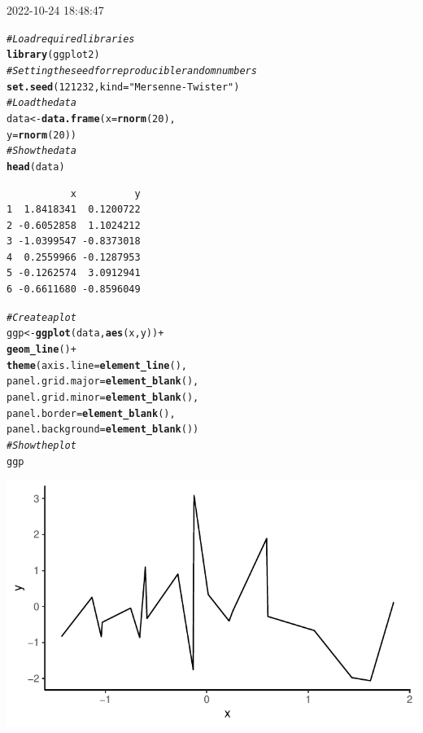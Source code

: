 \documentclass{article}\usepackage[]{graphicx}\usepackage[]{xcolor}
\makeatletter
\def\maxwidth{ %
  \ifdim\Gin@nat@width>\linewidth
    \linewidth
  \else
    \Gin@nat@width
  \fi
}
\newcommand{\hlnum}[1]{\textcolor[rgb]{0.686,0.059,0.569}{#1}}%
\newcommand{\hlstr}[1]{\textcolor[rgb]{0.192,0.494,0.8}{#1}}%
\newcommand{\hlcom}[1]{\textcolor[rgb]{0.678,0.584,0.686}{\textit{#1}}}%
\newcommand{\hlopt}[1]{\textcolor[rgb]{0,0,0}{#1}}%
\newcommand{\hlstd}[1]{\textcolor[rgb]{0.345,0.345,0.345}{#1}}%
\newcommand{\hlkwb}[1]{\textcolor[rgb]{0.69,0.353,0.396}{#1}}%
\newcommand{\hlkwc}[1]{\textcolor[rgb]{0.333,0.667,0.333}{#1}}%
\newcommand{\hlkwd}[1]{\textcolor[rgb]{0.737,0.353,0.396}{\textbf{#1}}}%
\newenvironment{kframe}{%
 \def\at@end@of@kframe{}%
 \ifinner\ifhmode%
  \def\at@end@of@kframe{\end{minipage}}%
  \begin{minipage}{\columnwidth}%
 \fi\fi%
 \def\FrameCommand##1{\hskip\@totalleftmargin \hskip-\fboxsep
 \colorbox{shadecolor}{##1}\hskip-\fboxsep
     \hskip-\linewidth \hskip-\@totalleftmargin \hskip\columnwidth}%
 \MakeFramed {\advance\hsize-\width
   \@totalleftmargin\z@ \linewidth\hsize
   \@setminipage}}%
 {\par\unskip\endMakeFramed%
 \at@end@of@kframe}
\newenvironment{knitrout}{}{} %
\makeatother
\begin{document}


2022-10-24 18:48:47
\begin{knitrout}
\color{fgcolor}\begin{kframe}
\begin{alltt}
\hlcom{# Load required libraries}
\hlkwd{library}\hlstd{(ggplot2)}
\hlcom{# Setting the seed for reproducible random numbers}
\hlkwd{set.seed}\hlstd{(}\hlnum{121232}\hlstd{,} \hlkwc{kind} \hlstd{=} \hlstr{"Mersenne-Twister"}\hlstd{)}
\hlcom{# Load the data}
\hlstd{data} \hlkwb{<-} \hlkwd{data.frame}\hlstd{(}\hlkwc{x} \hlstd{=} \hlkwd{rnorm}\hlstd{(}\hlnum{20}\hlstd{),}
                   \hlkwc{y} \hlstd{=} \hlkwd{rnorm}\hlstd{(}\hlnum{20}\hlstd{))}
\hlcom{# Show the data}
\hlkwd{head}\hlstd{(data)}
\end{alltt}
\begin{verbatim}
           x          y
1  1.8418341  0.1200722
2 -0.6052858  1.1024212
3 -1.0399547 -0.8373018
4  0.2559966 -0.1287953
5 -0.1262574  3.0912941
6 -0.6611680 -0.8596049
\end{verbatim}
\begin{alltt}
\hlcom{# Create a plot}
\hlstd{ggp} \hlkwb{<-} \hlkwd{ggplot}\hlstd{(data,} \hlkwd{aes}\hlstd{(x, y))} \hlopt{+}
  \hlkwd{geom_line}\hlstd{()} \hlopt{+}
  \hlkwd{theme}\hlstd{(}\hlkwc{axis.line} \hlstd{=} \hlkwd{element_line}\hlstd{(),}
        \hlkwc{panel.grid.major} \hlstd{=} \hlkwd{element_blank}\hlstd{(),}
        \hlkwc{panel.grid.minor} \hlstd{=} \hlkwd{element_blank}\hlstd{(),}
        \hlkwc{panel.border} \hlstd{=} \hlkwd{element_blank}\hlstd{(),}
        \hlkwc{panel.background} \hlstd{=} \hlkwd{element_blank}\hlstd{())}
\hlcom{# Show the plot}
\hlstd{ggp}
\end{alltt}
\end{kframe}

{\centering \includegraphics[width=\maxwidth]{figure/unnamed-chunk-1-1} 

}


\end{knitrout}
\end{document}
